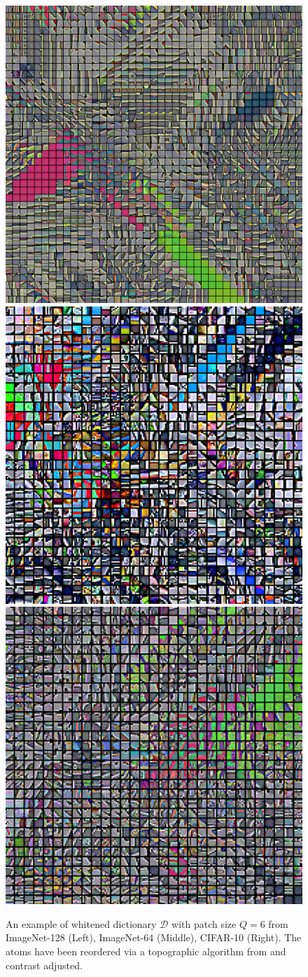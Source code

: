 \documentclass{article} %
\begin{document}
\begin{figure}[h]
\centering
  	\includegraphics[width=0.28\linewidth]{figures/topographical_order_more_patches_imagenet128_patches_12}
  	  	\includegraphics[width=0.28\linewidth]{figures/topographical_order_more_patches_imagnet64_patches_6_30Images}
  	  	\includegraphics[width=0.28\linewidth]{figures/topographical_order_more_patches_cifar10_patches_6_30images}
\caption{An example of whitened dictionary  $\mathcal{D}$ with patch size $Q=6$ from ImageNet-128 (Left), ImageNet-64 (Middle), CIFAR-10 (Right). The atoms have been reordered via a topographic algorithm from \citet{Montobbio:2019} and contrast adjusted.}
\label{dico}
\end{figure}
\end{document}
